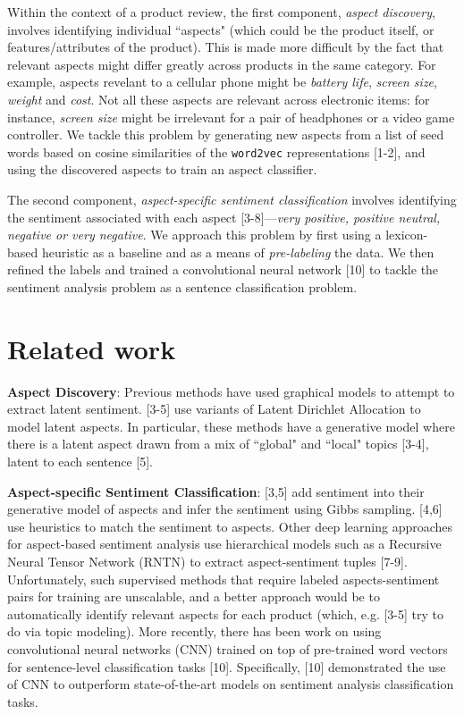 \documentclass{article} %
\begin{document}
Within the context of a product review, the first component, \textit{aspect discovery}, involves identifying individual ``aspects" (which could be the product itself, or features/attributes of the product). This is made more difficult by the fact that relevant aspects might differ greatly across products in the same category. For example, aspects revelant to a cellular phone might be \textit{battery life}, \textit{screen size}, \textit{weight} and \textit{cost}. Not all these aspects are relevant across electronic items: for instance, \textit{screen size} might be irrelevant for a pair of headphones or a video game controller. We tackle this problem by generating new aspects from a list of seed words based on cosine similarities of the \texttt{word2vec} representations [1-2], and using the discovered aspects to train an aspect classifier.

The second component, \textit{aspect-specific sentiment classification} involves identifying the sentiment associated with each aspect [3-8]---\textit{very positive, positive neutral, negative or very negative}. We approach this problem by first using a lexicon-based heuristic as a baseline and as a means of \textit{pre-labeling} the data. We then refined the labels and trained a convolutional neural network [10] to tackle the sentiment analysis problem as a sentence classification problem.

\section{Related work}


\textbf{Aspect Discovery}: Previous methods have used graphical models to attempt to extract latent sentiment. [3-5] use variants of Latent Dirichlet Allocation to model latent aspects. In particular, these methods have a generative model where there is a latent aspect drawn from a mix of ``global" and ``local" topics [3-4], latent to each sentence [5].



\textbf{Aspect-specific Sentiment Classification}: [3,5] add sentiment into their generative model of aspects and infer the sentiment using Gibbs sampling. [4,6] use heuristics to match the sentiment to aspects. Other deep learning approaches for aspect-based sentiment analysis use hierarchical models such as a Recursive Neural Tensor Network (RNTN) to extract aspect-sentiment tuples [7-9]. Unfortunately, such supervised methods that require labeled aspects-sentiment pairs for training are unscalable, and a better approach would be to automatically identify relevant aspects for each product (which, e.g. [3-5] try to do via topic modeling). More recently, there has been work on using convolutional neural networks (CNN) trained on top of pre-trained word vectors for sentence-level classification tasks [10]. Specifically, [10] demonstrated the use of CNN to outperform state-of-the-art models on sentiment analysis classification tasks.
\end{document}
